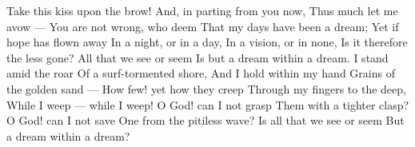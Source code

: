 %

\startlines
Take this kiss upon the brow!
And, in parting from you now,
Thus much let me avow —
You are not wrong, who deem
That my days have been a dream;
Yet if hope has flown away
In a night, or in a day,
In a vision, or in none,
Is it therefore the less gone?
All that we see or seem
Is but a dream within a dream.
\blank
I stand amid the roar
Of a surf-tormented shore,
And I hold within my hand
Grains of the golden sand —
How few! yet how they creep
Through my fingers to the deep,
While I weep — while I weep!
O God! can I not grasp
Them with a tighter clasp?
O God! can I not save
One from the pitiless wave?
Is all that we see or seem
But a dream within a dream?
\stoplines

